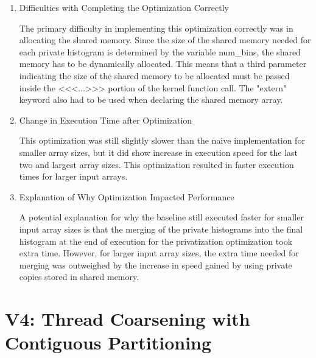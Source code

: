 \documentclass{article}
\begin{document}
\begin{enumerate}
	\item Difficulties with Completing the Optimization Correctly
	
	The primary difficulty in implementing this optimization correctly was in allocating the shared memory. Since the size of the shared memory needed for each private histogram is determined by the variable num\_bins, the shared memory has to be dynamically allocated. This means that a third parameter indicating the size of the shared memory to be allocated must be passed inside the <<<...>>> portion of the kernel function call. The "extern" keyword also had to be used when declaring the shared memory array.
	
	\item Change in Execution Time after Optimization
	
	This optimization was still slightly slower than the naive implementation for smaller array sizes, but it did show increase in execution speed for the last two and largest array sizes. This optimization resulted in faster execution times for larger input arrays. 
	
	\item Explanation of Why Optimization Impacted Performance
	
	A potential explanation for why the baseline still executed faster for smaller input array sizes is that the merging of the private histograms into the final histogram at the end of execution for the privatization optimization took extra time. However, for larger input array sizes, the extra time needed for merging was outweighed by the increase in speed gained by using private copies stored in shared memory. 
	
\end{enumerate}

\section{V4: Thread Coarsening with Contiguous Partitioning}
\end{document}
